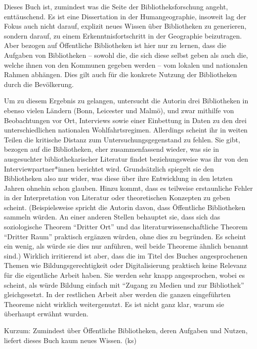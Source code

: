 \documentclass[a4paper,
fontsize=11pt,
oneside,
numbers=noperiodatend,
parskip=half-,
bibliography=totoc,
final
]{scrartcl}
\begin{document}
Dieses Buch ist, zumindest was die Seite der Bibliotheksforschung
angeht, enttäuschend. Es ist eine Dissertation in der Humangeographie,
insoweit lag der Fokus auch nicht darauf, explizit neues Wissen über
Bibliotheken zu generieren, sondern darauf, zu einem
Erkenntnisfortschritt in der Geographie beizutragen. Aber bezogen auf
Öffentliche Bibliotheken ist hier nur zu lernen, dass die Aufgaben von
Bibliotheken -- sowohl die, die sich diese selbst geben als auch die,
welche ihnen von den Kommunen gegeben werden -- vom lokalen und
nationalen Rahmen abhängen. Dies gilt auch für die konkrete Nutzung der
Bibliotheken durch die Bevölkerung.

Um zu diesem Ergebnis zu gelangen, untersucht die Autorin drei
Bibliotheken in ebenso vielen Ländern (Bonn, Leicester und Malmö), und
zwar mithilfe von Beobachtungen vor Ort, Interviews sowie einer
Einbettung in Daten zu den drei unterschiedlichen nationalen
Wohlfahrtsregimen. Allerdings scheint ihr in weiten Teilen die kritische
Distanz zum Untersuchungsgegenstand zu fehlen. Sie gibt, bezogen auf die
Bibliotheken, eher zusammenfassend wieder, was sie in ausgesuchter
bibliothekarischer Literatur findet beziehungsweise was ihr von den
Interviewpartner*innen berichtet wird. Grundsätzlich spiegelt sie den
Bibliotheken also nur wider, was diese über ihre Entwicklung in den
letzten Jahren ohnehin schon glauben. Hinzu kommt, dass es teilweise
erstaunliche Fehler in der Interpretation von Literatur oder
theoretischen Konzepten zu geben scheint. (Beispielsweise spricht die
Autorin davon, dass Öffentliche Bibliotheken sammeln würden. An einer
anderen Stellen behauptet sie, dass sich das soziologische Theorem
\enquote{Dritter Ort} und das literaturwissenschaftliche Theorem
\enquote{Dritter Raum} praktisch ergänzen würden, ohne dies zu
begründen. Es scheint ein wenig, als würde sie dies nur anführen, weil
beide Theoreme ähnlich benannt sind.) Wirklich irritierend ist aber,
dass die im Titel des Buches angesprochenen Themen wie
Bildungsgerechtigkeit oder Digitalisierung praktisch keine Relevanz für
die eigentliche Arbeit haben. Sie werden sehr knapp angesprochen, wobei
es scheint, als würde Bildung einfach mit \enquote{Zugang zu Medien und
zur Bibliothek} gleichgesetzt. In der restlichen Arbeit aber werden die
ganzen eingeführten Theoreme nicht wirklich weitergenutzt. Es ist nicht
ganz klar, warum sie überhaupt erwähnt wurden.

Kurzum: Zumindest über Öffentliche Bibliotheken, deren Aufgaben und
Nutzen, liefert dieses Buch kaum neues Wissen. (ks)
\end{document}
